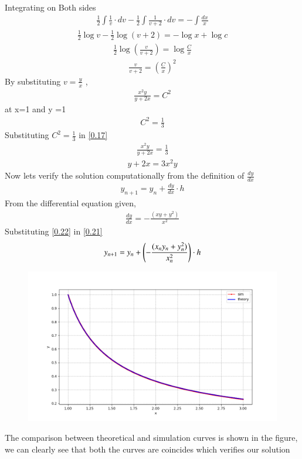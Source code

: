\documentclass[journal]{IEEEtran}
\begin{document}
Integrating on Both sides
\begin{align}
   \frac{1}{2}\int\frac{1}{v} \cdot dv - \frac{1}{2}\int\frac{1}{v+2}\cdot dv = -\int \frac{dx}{x}
\end{align}
\begin{align}
    \frac{1}{2}\log v - \frac{1}{2}\log (v+2) = - \log{x} + \log c
\end{align}
\begin{align}
    \frac{1}{2} \log (\frac{v}{v+2}) = \log \frac{C}{x}
\end{align}
\begin{align}
    \frac{v}{v+2} = (\frac{C}{x})^2
\end{align}
By substituting $v=\frac{y}{x}$ ,
\begin{align}
    \frac{x^2 y}{y+2x} =  C^2
    \label{0.17}
\end{align}
at x=1 and y =1 
\begin{align}
    C^2 = \frac{1}{3}
\end{align}
Substituting $C^2 = \frac{1}{3}$ in \ref{0.17} 
\begin{align}
    \frac{x^2y}{y+2x} = \frac{1}{3}
\end{align}
\begin{align}
    y+2x = 3x^2y
\end{align}
Now lets verify the solution computationally from the definition of $\frac{dy}{dx}$
\begin{align}
    y_{n+1}= y_{n} + \frac{dy}{dx} \cdot h
    \label{0.21}
\end{align}
From the differential equation given,
\begin{align}
    \frac{dy}{dx} = -\frac{(xy+y^2)}{x^2}
    \label{0.22}
\end{align}
Substituting \ref{0.22} in \ref{0.21}
\begin{align}
    y_{n+1} = y_n + \left(-\frac{(x_{n}y_{n}+y_{n}^2)}{x_{n}^2}\right) \cdot h 
\end{align}
\begin{figure}
    \centering
    \includegraphics[width=\columnwidth]{figs/Figure_1.png}
\end{figure}
The comparison between theoretical and simulation curves is shown in the figure, we can clearly see that both the curves are coincides which verifies our solution
\end{document}
